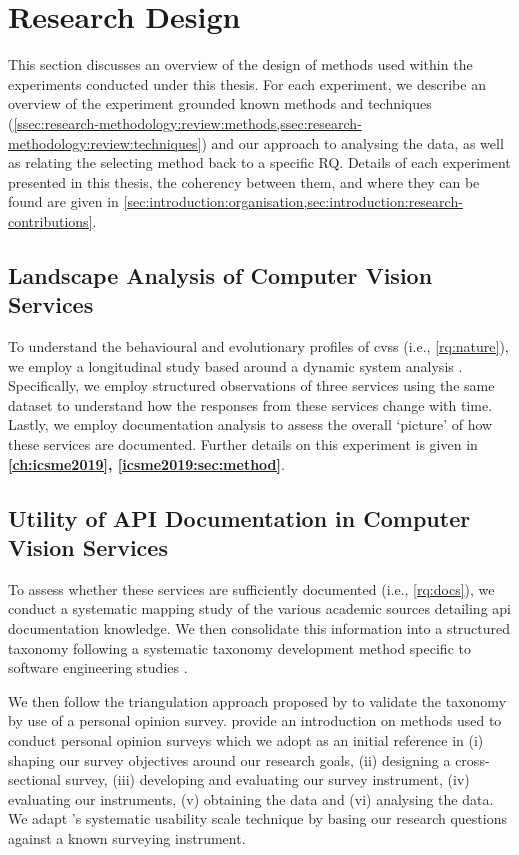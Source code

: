 \newcontent
\section{Research Design}
\label{sec:research-methodology:experiments}

This section discusses an overview of the design of methods used within the experiments conducted under this thesis. For each experiment, we describe an overview of the experiment grounded known methods and techniques (\cref{ssec:research-methodology:review:methods,ssec:research-methodology:review:techniques}) and our approach to analysing the data, as well as relating the selecting method back to a specific RQ. Details of each experiment presented in this thesis, the coherency between them, and where they can be found are given in \cref{sec:introduction:organisation,sec:introduction:research-contributions}.

\subsection{Landscape Analysis of Computer Vision Services}

To understand the behavioural and evolutionary profiles of \glspl{cvs} (i.e., \ref{rq:nature}), we employ a longitudinal study based around a dynamic system analysis \citep{Singer:2007tu}. Specifically, we employ structured observations of three services using the same dataset to understand how the responses from these services change with time. Lastly, we employ documentation analysis to assess the overall `picture' of how these services are documented. Further details on this experiment is given in \textbf{\cref{ch:icsme2019}, \cref{icsme2019:sec:method}}.

\subsection{Utility of API Documentation in Computer Vision Services}

To assess whether these services are sufficiently documented (i.e., \ref{rq:docs}), we conduct a systematic mapping study \citep{Kitchenham:2007dd,Petersen:2008td} of the various academic sources detailing \gls{api} documentation knowledge. We then consolidate this information into a structured taxonomy following a systematic taxonomy development method specific to software engineering studies \citep{Usman:2017hn}.

We then follow the triangulation approach proposed by \citet{Jick:1979el} to validate the taxonomy by use of a personal opinion survey. \citet{Kitchenham:2007ux} provide an introduction on methods used to conduct personal opinion surveys which we adopt as an initial reference in (i) shaping our survey objectives around our research goals, (ii) designing a cross-sectional survey, (iii) developing and evaluating our survey instrument, (iv) evaluating our instruments, (v) obtaining the data and (vi) analysing the data. We adapt \citeauthor{Brooke:1996ua}'s systematic usability scale \citep{Brooke:1996ua} technique by basing our research questions against a known surveying instrument.

